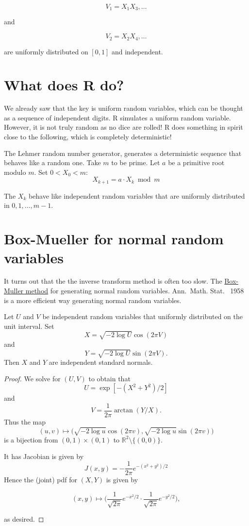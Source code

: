 \documentclass[
]{article}
\theoremstyle{definition}
\theoremstyle{definition}
\theoremstyle{definition}
\theoremstyle{remark}
\begin{document}
\[V_1 = X_1 X_3, \ldots\]

and

\[V_2 = X_2 X_4, \ldots\]

are uniformly distributed on \([0,1]\) and independent.

\hypertarget{what-does-r-do}{%
\section{What does R do?}\label{what-does-r-do}}

We already saw that the key is uniform random variables, which can be thought as a sequence of independent digits. R simulates a uniform random variable. However, it is not truly random as no dice are rolled! R does something in spirit close to the following, which is completely deterministic!

The Lehmer random number generator, generates a deterministic sequence that behaves like a random one. Take \(m\) to be prime. Let \(a\) be a primitive root modulo \(m\). Set \(0 < X_0 < m\):\\
\[X_{k+1} = a \cdot X_k \bmod m\]

The \(X_k\) behave like independent random variables that are uniformly distributed in \(0, 1, \ldots, m-1\).

\hypertarget{box-mueller-for-normal-random-variables}{%
\section{Box-Mueller for normal random variables}\label{box-mueller-for-normal-random-variables}}

It turns out that the the inverse transform method is often too slow. The \href{https://projecteuclid.org/journals/annals-of-mathematical-statistics/volume-29/issue-2/A-Note-on-the-Generation-of-Random-Normal-Deviates/10.1214/aoms/1177706645.full}{Box-Muller method} for generating normal random variables. Ann.~Math. Stat.~ 1958 is a more efficient way generating normal random variables.

Let \(U\) and \(V\) be independent random variables that uniformly distributed on the unit interval. Set
\[X = \sqrt{ -2 \log U} \cos (2 \pi V)\]
and
\[Y =     \sqrt{ -2 \log U} \sin (2 \pi V).\]
Then \(X\) and \(Y\) are independent standard normals.

\begin{proof}
{}We solve for \((U,V)\) to obtain that
\[U = \exp[  -(X^2 + Y^2)/2]\]
and
\[V =  \frac{1}{2\pi} \arctan(Y /X).\]
Thus the map \[(u, v) \mapsto  \big (\sqrt{ -2 \log u} \cos (2 \pi v),  \sqrt{ -2 \log u} \sin (2 \pi v)  \big)\]
is a bijection from \((0,1) \times (0,1)\) to \(\mathbb{R}^2 \setminus \{ (0,0)\}.\)

It has Jacobian is given by
\[J(x,y) = -\frac{1}{2\pi } e^{-(x^2 + y^2)/2}\]
Hence the (joint) pdf for \((X,Y)\) is given by

\[(x,y) \mapsto  \Big( \frac{1}{\sqrt{2 \pi} } e^{-x^2/2}  \cdot    \frac{1}{\sqrt{2 \pi}}  e^{-y^2/2} \Big),\]

as desired.
\end{proof}
\end{document}
